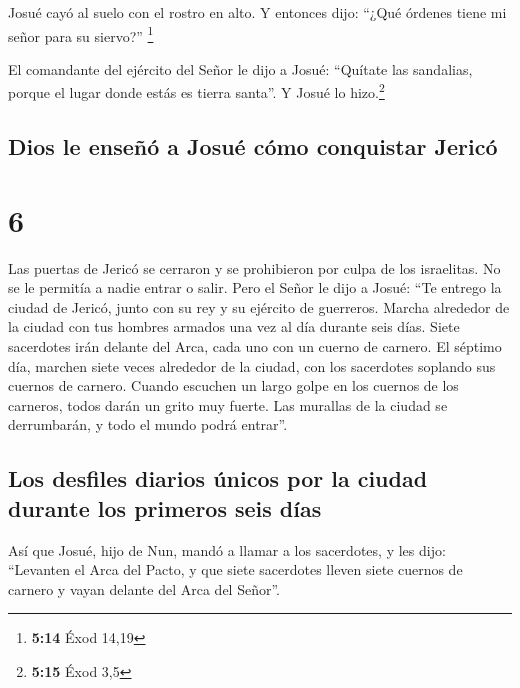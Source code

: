  Josué cayó al suelo con el rostro en alto. Y entonces
dijo: ``¿Qué órdenes tiene mi señor para su siervo?'' \footnote{\textbf{5:14}
  Éxod 14,19}

 El comandante del ejército del Señor le dijo a Josué:
``Quítate las sandalias, porque el lugar donde estás es tierra santa''.
Y Josué lo hizo.\footnote{\textbf{5:15} Éxod 3,5}

\hypertarget{dios-le-enseuxf1uxf3-a-josuuxe9-cuxf3mo-conquistar-jericuxf3}{%
\subsection{Dios le enseñó a Josué cómo conquistar
Jericó}\label{dios-le-enseuxf1uxf3-a-josuuxe9-cuxf3mo-conquistar-jericuxf3}}

\hypertarget{section-5}{%
\section{6}\label{section-5}}

 Las puertas de Jericó se cerraron y se prohibieron por
culpa de los israelitas. No se le permitía a nadie entrar o salir.
 Pero el Señor le dijo a Josué: ``Te entrego la ciudad de
Jericó, junto con su rey y su ejército de guerreros. 
Marcha alrededor de la ciudad con tus hombres armados una vez al día
durante seis días.  Siete sacerdotes irán delante del
Arca, cada uno con un cuerno de carnero. El séptimo día, marchen siete
veces alrededor de la ciudad, con los sacerdotes soplando sus cuernos de
carnero.  Cuando escuchen un largo golpe en los cuernos de
los carneros, todos darán un grito muy fuerte. Las murallas de la ciudad
se derrumbarán, y todo el mundo podrá entrar''.

\hypertarget{los-desfiles-diarios-uxfanicos-por-la-ciudad-durante-los-primeros-seis-duxedas}{%
\subsection{Los desfiles diarios únicos por la ciudad durante los
primeros seis
días}\label{los-desfiles-diarios-uxfanicos-por-la-ciudad-durante-los-primeros-seis-duxedas}}

 Así que Josué, hijo de Nun, mandó a llamar a los
sacerdotes, y les dijo: ``Levanten el Arca del Pacto, y que siete
sacerdotes lleven siete cuernos de carnero y vayan delante del Arca del
Señor''.

